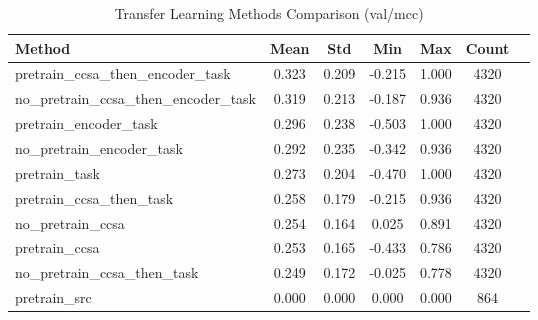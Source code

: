 \documentclass{article}
\begin{document}
\begin{table}[h!]
\centering
\caption{Transfer Learning Methods Comparison (val/mcc)}
\begin{tabular}{lcccccc}
\toprule
Method & Mean & Std & Min & Max & Count \\
\midrule
pretrain\_ccsa\_then\_encoder\_task & 0.323 & 0.209 & -0.215 & 1.000 & 4320 \\
no\_pretrain\_ccsa\_then\_encoder\_task & 0.319 & 0.213 & -0.187 & 0.936 & 4320 \\
pretrain\_encoder\_task & 0.296 & 0.238 & -0.503 & 1.000 & 4320 \\
no\_pretrain\_encoder\_task & 0.292 & 0.235 & -0.342 & 0.936 & 4320 \\
pretrain\_task & 0.273 & 0.204 & -0.470 & 1.000 & 4320 \\
pretrain\_ccsa\_then\_task & 0.258 & 0.179 & -0.215 & 0.936 & 4320 \\
no\_pretrain\_ccsa & 0.254 & 0.164 & 0.025 & 0.891 & 4320 \\
pretrain\_ccsa & 0.253 & 0.165 & -0.433 & 0.786 & 4320 \\
no\_pretrain\_ccsa\_then\_task & 0.249 & 0.172 & -0.025 & 0.778 & 4320 \\
pretrain\_src & 0.000 & 0.000 & 0.000 & 0.000 & 864 \\
\bottomrule
\end{tabular}
\label{tab:transfer_learning_methods_val_mcc}
\end{table}
\end{document}

